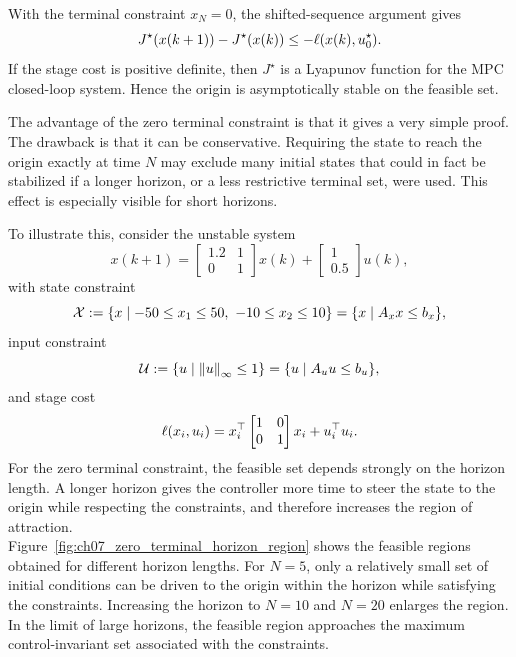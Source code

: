 \begin{theorembox}[Stability for {\ensuremath{x_N=0}}]
With the terminal constraint \(x_N=0\), the shifted-sequence argument gives
\[
    J^\star(x(k+1))-J^\star(x(k))
    \leq
    -\ell(x(k),u_0^\star).
\]
If the stage cost is positive definite, then \(J^\star\) is a Lyapunov function for the MPC
closed-loop system. Hence the origin is asymptotically stable on the feasible set.
\end{theorembox}

The advantage of the zero terminal constraint is that it gives a very simple proof. The drawback
is that it can be conservative. Requiring the state to reach the origin exactly at time \(N\) may
exclude many initial states that could in fact be stabilized if a longer horizon, or a less
restrictive terminal set, were used. This effect is especially visible for short horizons.

To illustrate this, consider the unstable system
\[
    x(k+1)
    =
    \begin{bmatrix}
        1.2 & 1\\
        0 & 1
    \end{bmatrix}x(k)
    +
    \begin{bmatrix}
        1\\
        0.5
    \end{bmatrix}u(k),
\]
with state constraint
\[
    \mathcal{X}
    :=
    \{x\mid -50\leq x_1\leq 50,\ -10\leq x_2\leq 10\}
    =
    \{x\mid A_xx\leq b_x\},
\]
input constraint
\[
    \mathcal{U}
    :=
    \{u\mid \left\lVert u \right\rVert_\infty\leq 1\}
    =
    \{u\mid A_uu\leq b_u\},
\]
and stage cost
\[
    \ell(x_i,u_i)
    =
    x_i^\top
    \begin{bmatrix}
        1 & 0\\
        0 & 1
    \end{bmatrix}
    x_i
    +
    u_i^\top u_i.
\]
For the zero terminal constraint, the feasible set depends strongly on the horizon length. A
longer horizon gives the controller more time to steer the state to the origin while respecting
the constraints, and therefore increases the region of attraction.\\
Figure~\ref{fig:ch07_zero_terminal_horizon_region} shows the feasible regions obtained for
different horizon lengths. For \(N=5\), only a relatively small set of initial conditions can be
driven to the origin within the horizon while satisfying the constraints. Increasing the horizon
to \(N=10\) and \(N=20\) enlarges the region. In the limit of large horizons, the feasible region
approaches the maximum control-invariant set associated with the constraints.


